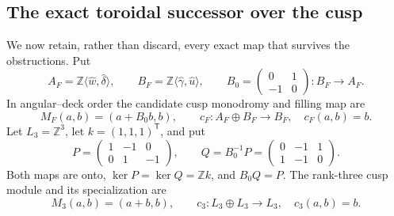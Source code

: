 \subsection{The exact toroidal successor over the cusp}
\label{h24:sec:torus-successor}

We now retain, rather than discard, every exact map that survives the
obstructions.  Put
\[
 A_F=\mathbb Z\langle\widehat w,\widehat\delta\rangle,\qquad
 B_F=\mathbb Z\langle\widehat\gamma,\widehat u\rangle,\qquad
 B_0=\begin{pmatrix}0&1\\-1&0\end{pmatrix}:B_F\to A_F.
\]
In angular--deck order the candidate cusp monodromy and filling map are
\begin{equation}
 M_F(a,b)=(a+B_0b,b),\qquad
 c_F:A_F\oplus B_F\longrightarrow B_F,\quad c_F(a,b)=b.
 \label{h24:eq:candidate-cusp-module}
\end{equation}
Let $L_3=\mathbb Z^3$, let $k=(1,1,1)^{\mathsf T}$, and put
\begin{equation}
 P=\begin{pmatrix}1&-1&0\\0&1&-1\end{pmatrix},\qquad
 Q=B_0^{-1}P=\begin{pmatrix}0&-1&1\\1&-1&0\end{pmatrix}.
 \label{h24:eq:PQ}
\end{equation}
Both maps are onto, $\ker P=\ker Q=\mathbb Z k$, and $B_0Q=P$.
The rank-three cusp module and its specialization are
\begin{equation}
 M_3(a,b)=(a+b,b),\qquad
 c_3:L_3\oplus L_3\longrightarrow L_3,\quad c_3(a,b)=b.
 \label{h24:eq:rank3-cusp-module}
\end{equation}


